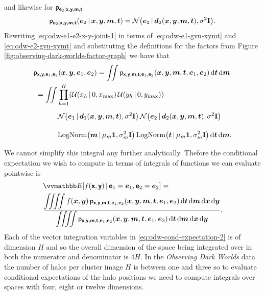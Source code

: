 and likewise for $\mathsf{p}_{\boldsymbol{\mathsf{e}}_2 | \boldsymbol{\mathsf{x}},\boldsymbol{\mathsf{y}},\boldsymbol{\mathsf{m}},\boldsymbol{\mathsf{t}}}$
\begin{equation}\label{eq:odw-e2-gvn-xymt}
  \pden{\rvct{e}_2 | \rvct{x},\rvct{y},\rvct{m},\rvct{t}}(\vct{e}_2\gvn\vct{x},\vct{y},\vct{m},\vct{t})
  =
  \nrm{\vct{e}_2 \gvn \vct{d}_2(\vct{x},\vct{y},\vct{m},\vct{t}),\sigma^2\idmtx}.
\end{equation}
Rewriting \eqref{eq:odw-e1-e2-x-y-joint-1} in terms of \eqref{eq:odw-e1-gvn-xymt} and \eqref{eq:odw-e2-gvn-xymt} and substituting the definitions for the factors from Figure \ref{fig:observing-dark-worlds-factor-graph} we have that
\begin{equation}\label{eq:odw-e1-e2-x-y-joint-2}
\begin{split}
  &\pden{\rvct{x},\rvct{y},\rvct{e}_1,\rvct{e}_2}(\vct{x},\vct{y},\vct{e}_1,\vct{e}_2) =
  \iint 
    \pden
      {\rvct{x},\rvct{y},\rvct{m},\rvct{t},\rvct{e}_1,\rvct{e}_2}
      (\vct{x},\vct{y},\vct{m},\vct{t},\vct{e}_1,\vct{e}_2)
   \,\dr\vct{t}\,\dr\vct{m}
  \\
  &
  ~=\iint
  \prod_{h=1}^H \lpa 
    \mathcal{U}\lpa x_h \gvn 0,x_{\textrm{max}}\rpa \,
    \mathcal{U}\lpa y_h \gvn 0,y_{\textrm{max}}\rpa 
  \rpa 
  \\
  &
  \phantom{~=\iint}~
    \nrm{\vct{e}_1 \gvn \vct{d}_1(\vct{x},\vct{y},\vct{m},\vct{t}),\sigma^2\idmtx}\,
    \nrm{\vct{e}_2 \gvn \vct{d}_2(\vct{x},\vct{y},\vct{m},\vct{t}),\sigma^2\idmtx}
  \\
  &\phantom{~=\iint}~
    \textrm{LogNorm}\lpa \vct{m} \gvn \mu_m\vct{1}, \sigma_m^2\idmtx \rpa \, 
    \textrm{LogNorm}\lpa \vct{t} \gvn \mu_m\vct{1}, \sigma_m^2\idmtx \rpa
  \,\dr\vct{t}\,\dr\vct{m}.
\end{split}
\end{equation}
We cannot simplify this integral any further analytically. Thefore the conditional expectation we wish to compute in terms of integrals of functions we can evaluate pointwise is
\begin{equation}\label{eq:odw-cond-expectation-2}
\begin{split}
  &\expc{f(\rvct{x},\rvct{y}) \gvn \rvct{e}_1 =\vct{e}_1, \rvct{e}_2=\vct{e}_2} = \\
  &
  \frac
  {\displaystyle
    \iiiint f(\vct{x},\vct{y}) \, 
    \pden
      {\rvct{x},\rvct{y},\rvct{m},\rvct{t},\rvct{e}_1,\rvct{e}_2}
      (\vct{x},\vct{y},\vct{m},\vct{t},\vct{e}_1,\vct{e}_2)
    \,\dr\vct{t}\,\dr\vct{m}\,\dr{\vct{x}}\,\dr{\vct{y}}
  }
  {\displaystyle
    \iiiint
      \pden
      {\rvct{x},\rvct{y},\rvct{m},\rvct{t},\rvct{e}_1,\rvct{e}_2}
      (\vct{x},\vct{y},\vct{m},\vct{t},\vct{e}_1,\vct{e}_2)
    \,\dr\vct{t}\,\dr\vct{m}\,\dr{\vct{x}}\,\dr{\vct{y}}
  }.
\end{split}
\end{equation}
Each of the vector integration variables in \eqref{eq:odw-cond-expectation-2} is of dimension $H$ and so the overall dimension of the space being integrated over in both the numerator and denominator is $4H$.
In the \emph{Observing Dark Worlds} data the number of halos per cluster image $H$ is between one and three so to evaluate conditional expectations of the halo positions we need to compute integrals over spaces with four, eight or twelve dimensions. 

